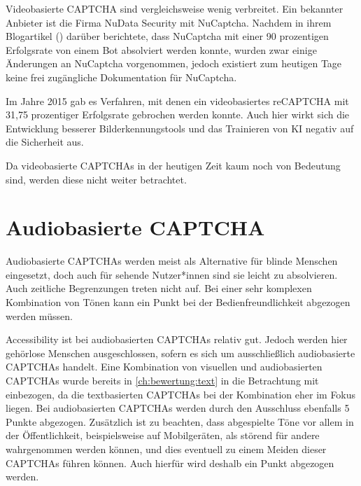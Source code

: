Videobasierte CAPTCHA sind vergleichsweise wenig verbreitet. 
Ein bekannter Anbieter ist die Firma NuData Security mit NuCaptcha.
Nachdem \citeauthor{elie} in ihrem Blogartikel  (\cite{elie}) darüber berichtete, 
dass NuCaptcha mit einer 90 prozentigen Erfolgsrate von einem Bot absolviert werden konnte,
wurden zwar einige Änderungen an NuCaptcha vorgenommen, jedoch existiert zum heutigen Tage keine frei zugängliche Dokumentation für NuCaptcha.

Im Jahre 2015 gab es Verfahren, mit denen ein videobasiertes reCAPTCHA mit 31,75 prozentiger Erfolgsrate gebrochen werden konnte. 
Auch hier wirkt sich die Entwicklung besserer Bilderkennungstools und das Trainieren von KI negativ auf die Sicherheit aus.\cite[p.79]{surveyofresearch}

Da videobasierte CAPTCHAs in der heutigen Zeit kaum noch von Bedeutung sind, werden diese nicht weiter betrachtet.

\section{Audiobasierte CAPTCHA}
\label{ch:bewertung:audio}
Audiobasierte CAPTCHAs werden meist als Alternative für blinde Menschen eingesetzt, 
doch auch für sehende Nutzer*innen sind sie leicht zu absolvieren.
Auch zeitliche Begrenzungen treten nicht auf.
Bei einer sehr komplexen Kombination von Tönen kann ein Punkt bei der Bedienfreundlichkeit abgezogen werden müssen.

Accessibility ist bei audiobasierten CAPTCHAs relativ gut. 
Jedoch werden hier gehörlose Menschen ausgeschlossen, sofern es sich um ausschließlich audiobasierte CAPTCHAs handelt.
Eine Kombination von visuellen und audiobasierten CAPTCHAs wurde bereits in \autoref{ch:bewertung:text} in die Betrachtung mit einbezogen,
da die textbasierten CAPTCHAs bei der Kombination eher im Fokus liegen.
Bei audiobasierten CAPTCHAs werden durch den Ausschluss ebenfalls 5 Punkte abgezogen.
Zusätzlich ist zu beachten, dass abgespielte Töne vor allem in der Öffentlichkeit, beispielsweise auf Mobilgeräten, als störend für andere wahrgenommen werden können,
und dies eventuell zu einem Meiden dieser CAPTCHAs führen können.
Auch hierfür wird deshalb ein Punkt abgezogen werden. 

